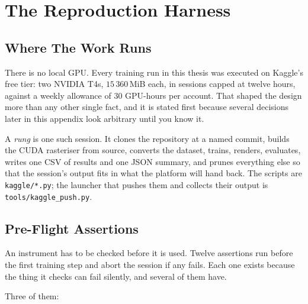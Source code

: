 \chapter{The Reproduction Harness}
\label{app:harness}


\section{Where The Work Runs}

There is no local GPU. Every training run in this thesis was executed on Kaggle's
free tier: two NVIDIA T4s, $15\,360$\,MiB each, in sessions capped at twelve
hours, against a weekly allowance of $30$ GPU-hours per account. That shaped the
design more than any other single fact, and it is stated first because several
decisions later in this appendix look arbitrary until you know it.

A \emph{rung} is one such session. It clones the repository at a named commit,
builds the CUDA rasteriser from source, converts the dataset, trains, renders,
evaluates, writes one CSV of results and one JSON summary, and prunes everything
else so that the session's output fits in what the platform will hand back. The
scripts are \texttt{kaggle/*.py}; the launcher that pushes them and collects
their output is \texttt{tools/kaggle\_push.py}.

\section{Pre-Flight Assertions}
\label{app:preflight}

An instrument has to be checked before it is used. Twelve assertions run before
the first training step and abort the session if any fails. Each one exists
because the thing it checks can fail silently, and several of them have.



Three of them:

